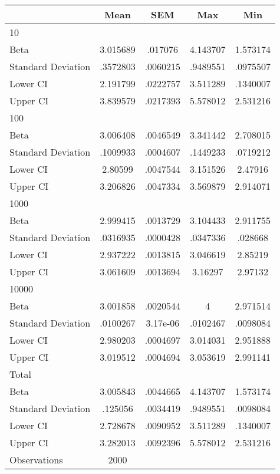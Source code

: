 {
\def\sym#1{\ifmmode^{#1}\else\(^{#1}\)\fi}
\begin{tabular}{l*{1}{cccc}}
\hline\hline
                    &        Mean&         SEM&         Max&         Min\\
\hline
10                  &            &            &            &            \\
Beta                &    3.015689&     .017076&    4.143707&    1.573174\\
Standard Deviation  &    .3572803&    .0060215&    .9489551&    .0975507\\
Lower CI            &    2.191799&    .0222757&    3.511289&    .1340007\\
Upper CI            &    3.839579&    .0217393&    5.578012&    2.531216\\
\hline
100                 &            &            &            &            \\
Beta                &    3.006408&    .0046549&    3.341442&    2.708015\\
Standard Deviation  &    .1009933&    .0004607&    .1449233&    .0719212\\
Lower CI            &     2.80599&    .0047544&    3.151526&     2.47916\\
Upper CI            &    3.206826&    .0047334&    3.569879&    2.914071\\
\hline
1000                &            &            &            &            \\
Beta                &    2.999415&    .0013729&    3.104433&    2.911755\\
Standard Deviation  &    .0316935&    .0000428&    .0347336&     .028668\\
Lower CI            &    2.937222&    .0013815&    3.046619&     2.85219\\
Upper CI            &    3.061609&    .0013694&     3.16297&     2.97132\\
\hline
10000               &            &            &            &            \\
Beta                &    3.001858&    .0020544&           4&    2.971514\\
Standard Deviation  &    .0100267&    3.17e-06&    .0102467&    .0098084\\
Lower CI            &    2.980203&    .0004697&    3.014031&    2.951888\\
Upper CI            &    3.019512&    .0004694&    3.053619&    2.991141\\
\hline
Total               &            &            &            &            \\
Beta                &    3.005843&    .0044665&    4.143707&    1.573174\\
Standard Deviation  &     .125056&    .0034419&    .9489551&    .0098084\\
Lower CI            &    2.728678&    .0090952&    3.511289&    .1340007\\
Upper CI            &    3.282013&    .0092396&    5.578012&    2.531216\\
\hline
Observations        &        2000&            &            &            \\
\hline\hline
\end{tabular}
}
